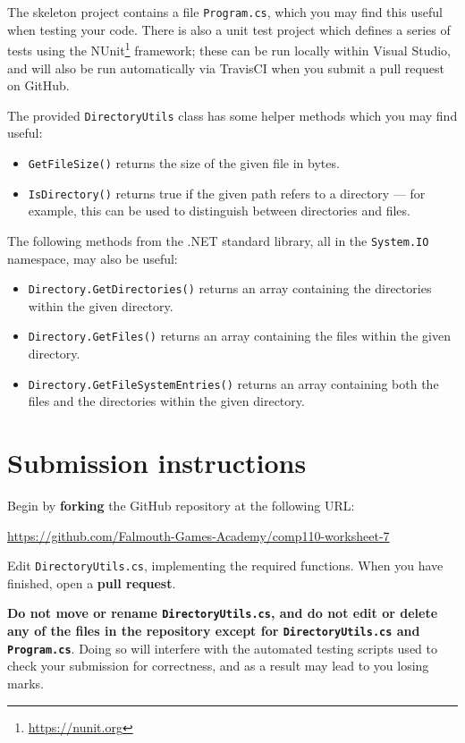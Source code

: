 \documentclass{../../../fal_assignment}
\begin{document}
The skeleton project contains a file \texttt{Program.cs}, which you may find this useful when testing your code.
There is also a unit test project which defines a series of tests using the NUnit\footnote{\url{https://nunit.org}} framework;
these can be run locally within Visual Studio, and will also be run automatically via TravisCI when you submit a pull request
on GitHub.

The provided \lstinline{DirectoryUtils} class has some helper methods which you may find useful:
\begin{itemize}
    \item \lstinline{GetFileSize()} returns the size of the given file in bytes.
    \item \lstinline{IsDirectory()} returns true if the given path refers to a directory --- for example,
        this can be used to distinguish between directories and files.
\end{itemize}
The following methods from the .NET standard library, all in the \lstinline{System.IO} namespace, may also be useful:
\begin{itemize}
    \item \lstinline{Directory.GetDirectories()} returns an array containing the directories within the given directory.
    \item \lstinline{Directory.GetFiles()} returns an array containing the files within the given directory.
    \item \lstinline{Directory.GetFileSystemEntries()} returns an array containing both the files and the directories within the given directory.
\end{itemize}

\section*{Submission instructions}

Begin by \textbf{forking} the GitHub repository at the following URL:

\url{https://github.com/Falmouth-Games-Academy/comp110-worksheet-7}

Edit \texttt{DirectoryUtils.cs}, implementing the required functions.
When you have finished, open a \textbf{pull request}.

\textbf{Do not move or rename \texttt{DirectoryUtils.cs}, and do not edit or delete any of the files in the repository except for \texttt{DirectoryUtils.cs} and \texttt{Program.cs}}.
Doing so will interfere with the automated testing scripts used to check your submission for correctness,
and as a result may lead to you losing marks.
\end{document}
